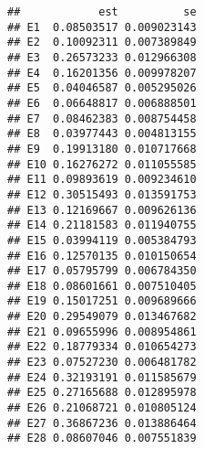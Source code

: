 \documentclass[]{article}
\newenvironment{Shaded}{\begin{snugshade}}{\end{snugshade}}
\newcommand{\NormalTok}[1]{#1}
\newcommand{\OperatorTok}[1]{\textcolor[rgb]{0.81,0.36,0.00}{\textbf{#1}}}
\begin{document}
\begin{verbatim}
##            est          se
## E1  0.08503517 0.009023143
## E2  0.10092311 0.007389849
## E3  0.26573233 0.012966308
## E4  0.16201356 0.009978207
## E5  0.04046587 0.005295026
## E6  0.06648817 0.006888501
## E7  0.08462383 0.008754458
## E8  0.03977443 0.004813155
## E9  0.19913180 0.010717668
## E10 0.16276272 0.011055585
## E11 0.09893619 0.009234610
## E12 0.30515493 0.013591753
## E13 0.12169667 0.009626136
## E14 0.21181583 0.011940755
## E15 0.03994119 0.005384793
## E16 0.12570135 0.010150654
## E17 0.05795799 0.006784350
## E18 0.08601661 0.007510405
## E19 0.15017251 0.009689666
## E20 0.29549079 0.013467682
## E21 0.09655996 0.008954861
## E22 0.18779334 0.010654273
## E23 0.07527230 0.006481782
## E24 0.32193191 0.011585679
## E25 0.27165688 0.012895978
## E26 0.21068721 0.010805124
## E27 0.36867236 0.013886464
## E28 0.08607046 0.007551839
\end{verbatim}

\begin{Shaded}
\end{Shaded}
\end{document}
